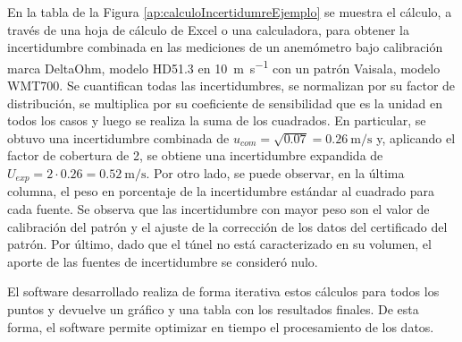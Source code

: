 En la tabla de la Figura \ref{ap:calculoIncertidumreEjemplo} se muestra el cálculo, a través de una hoja de cálculo de Excel o una calculadora, para obtener la incertidumbre combinada en las mediciones de un anemómetro bajo calibración marca DeltaOhm, modelo HD51.3 en \SI{10}{\meter\per\second} con un patrón Vaisala, modelo WMT700. Se cuantifican todas las incertidumbres, se normalizan por su factor de distribución, se multiplica por su coeficiente de sensibilidad que es la unidad en todos los casos y luego se realiza la suma de los cuadrados. En particular, se obtuvo una incertidumbre combinada de $u_{com} = \sqrt{0.07} = \SI{0.26}{\meter\per\second}$ y, aplicando el factor de cobertura de 2, se obtiene una incertidumbre expandida de $U_{exp} = 2 \cdot 0.26 = \SI{0.52}{\meter\per\second}$. Por otro lado, se puede observar, en la última columna, el peso en porcentaje de la incertidumbre estándar al cuadrado para cada fuente. Se observa que las incertidumbre con mayor peso son el valor de calibración del patrón y el ajuste de la corrección de los datos del certificado del patrón. Por último, dado que el túnel no está caracterizado en su volumen, el aporte de las fuentes de incertidumbre se consideró nulo.

El software desarrollado realiza de forma iterativa estos cálculos para todos los puntos y devuelve un gráfico y una tabla con los resultados finales. De esta forma, el software permite optimizar en tiempo el procesamiento de los datos.


\newpage
{}
